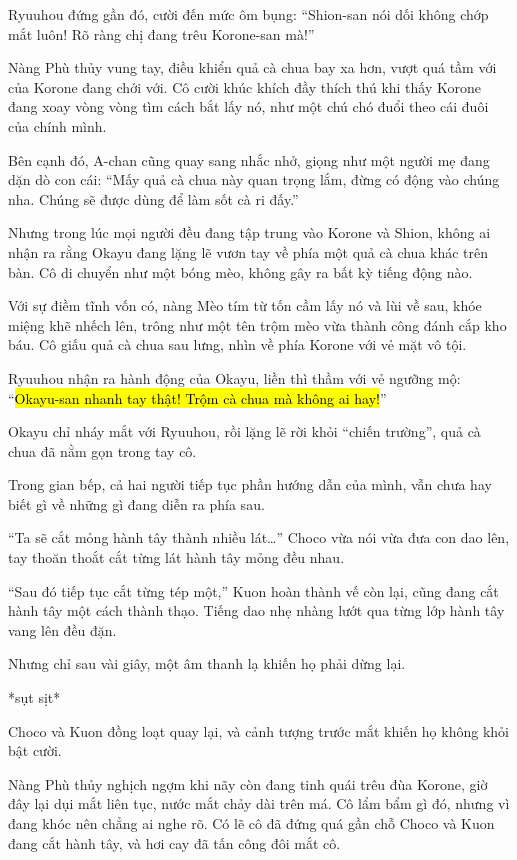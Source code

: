 \documentclass[../main.tex]{subfiles}
\begin{document}
Ryuuhou đứng gần đó, cười đến mức ôm bụng: ``Shion-san nói dối không chớp mắt luôn! Rõ ràng chị đang trêu Korone-san mà!''

Nàng Phù thủy vung tay, điều khiển quả cà chua bay xa hơn, vượt quá tầm với của Korone đang chới với. Cô cười khúc khích đầy thích thú khi thấy Korone đang xoay vòng vòng tìm cách bắt lấy nó, như một chú chó đuổi theo cái đuôi của chính mình.

Bên cạnh đó, A-chan cũng quay sang nhắc nhở, giọng như một người mẹ đang dặn dò con cái: ``Mấy quả cà chua này quan trọng lắm, đừng có động vào chúng nha. Chúng sẽ được dùng để làm sốt cà ri đấy.''

Nhưng trong lúc mọi người đều đang tập trung vào Korone và Shion, không ai nhận ra rằng Okayu đang lặng lẽ vươn tay về phía một quả cà chua khác trên bàn. Cô di chuyển như một bóng mèo, không gây ra bất kỳ tiếng động nào.


Với sự điềm tĩnh vốn có, nàng Mèo tím từ tốn cầm lấy nó và lùi về sau, khóe miệng khẽ nhếch lên, trông như một tên trộm mèo vừa thành công đánh cắp kho báu. Cô giấu quả cà chua sau lưng, nhìn về phía Korone với vẻ mặt vô tội.

Ryuuhou nhận ra hành động của Okayu, liền thì thầm với vẻ ngưỡng mộ: ``\hl{Okayu-san nhanh tay thật! Trộm cà chua mà không ai hay!}''

Okayu chỉ nháy mắt với Ryuuhou, rồi lặng lẽ rời khỏi ``chiến trường'', quả cà chua đã nằm gọn trong tay cô.

\ct

Trong gian bếp, cả hai người tiếp tục phần hướng dẫn của mình, vẫn chưa hay biết gì về những gì đang diễn ra phía sau.

``Ta sẽ cắt mỏng hành tây thành nhiều lát\dots'' Choco vừa nói vừa đưa con dao lên, tay thoăn thoắt cắt từng lát hành tây mỏng đều nhau.

``Sau đó tiếp tục cắt từng tép một,'' Kuon hoàn thành vế còn lại, cũng đang cắt hành tây một cách thành thạo. Tiếng dao nhẹ nhàng lướt qua từng lớp hành tây vang lên đều đặn.

Nhưng chỉ sau vài giây, một âm thanh lạ khiến họ phải dừng lại.

*sụt sịt*

Choco và Kuon đồng loạt quay lại, và cảnh tượng trước mắt khiến họ không khỏi bật cười.

Nàng Phù thủy nghịch ngợm khi nãy còn đang tinh quái trêu đùa Korone, giờ đây lại dụi mắt liên tục, nước mắt chảy dài trên má. Cô lẩm bẩm gì đó, nhưng vì đang khóc nên chẳng ai nghe rõ. Có lẽ cô đã đứng quá gần chỗ Choco và Kuon đang cắt hành tây, và hơi cay đã tấn công đôi mắt cô.
\end{document}
